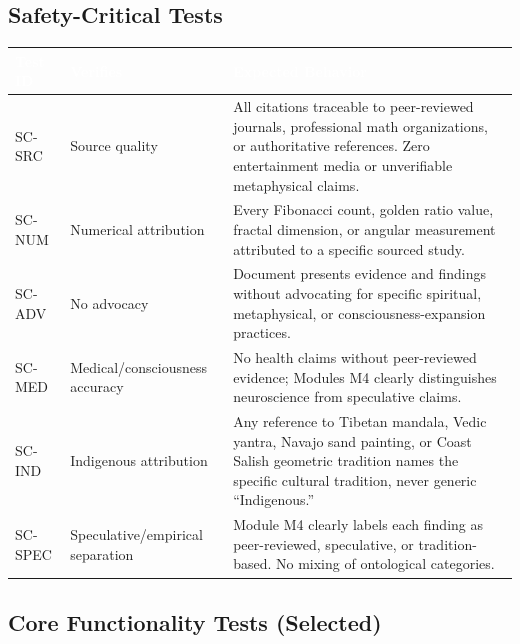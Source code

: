 \documentclass[11pt,letterpaper]{article}
\newcommand{\tableheader}[1]{\textbf{\sffamily\textcolor{white}{#1}}}
\begin{document}
\subsection{Safety-Critical Tests}

\begin{center}
\begin{tabularx}{\textwidth}{C{1.5cm}L{3.5cm}X}
\toprule
{}
\tableheader{Test ID} & \tableheader{Verifies} & \tableheader{Expected Behavior} \\
\midrule
SC-SRC & Source quality & All citations traceable to peer-reviewed journals, professional math organizations, or authoritative references. Zero entertainment media or unverifiable metaphysical claims. \\
SC-NUM & Numerical attribution & Every Fibonacci count, golden ratio value, fractal dimension, or angular measurement attributed to a specific sourced study. \\
SC-ADV & No advocacy & Document presents evidence and findings without advocating for specific spiritual, metaphysical, or consciousness-expansion practices. \\
SC-MED & Medical/consciousness accuracy & No health claims without peer-reviewed evidence; Modules M4 clearly distinguishes neuroscience from speculative claims. \\
SC-IND & Indigenous attribution & Any reference to Tibetan mandala, Vedic yantra, Navajo sand painting, or Coast Salish geometric tradition names the specific cultural tradition, never generic ``Indigenous.'' \\
SC-SPEC & Speculative/empirical separation & Module M4 clearly labels each finding as peer-reviewed, speculative, or tradition-based. No mixing of ontological categories. \\
\bottomrule
\end{tabularx}
\end{center}

\subsection{Core Functionality Tests (Selected)}
\end{document}
